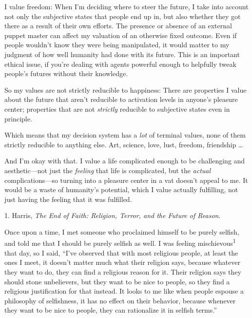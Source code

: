{
 I value freedom: When I'm deciding where to steer
the future, I take into account not only the subjective states that
people end up in, but also whether they got there as a result of their
own efforts. The presence or absence of an external puppet master can
affect my valuation of an otherwise fixed outcome. Even if people
wouldn't know they were being manipulated, it would
matter to my judgment of how well humanity had done with its future.
This is an important ethical issue, if you're dealing
with agents powerful enough to helpfully tweak people's
futures without their knowledge.}

{
 So my values are not strictly reducible to happiness: There are
properties I value about the future that aren't
reducible to activation levels in anyone's pleasure
center; properties that are not \textit{strictly} reducible to
subjective states even in principle.}

{
 Which means that my decision system has a \textit{lot} of terminal
values, none of them strictly reducible to anything else. Art, science,
love, lust, freedom, friendship \ldots}

{
 And I'm okay with that. I value a life complicated
enough to be challenging and aesthetic---not just the \textit{feeling}
that life is complicated, but the \textit{actual} complications---so
turning into a pleasure center in a vat doesn't appeal
to me. It would be a waste of humanity's potential,
which I value actually fulfilling, not just having the feeling that it
was fulfilled.}

\myendsectiontext


\bigskip

{
 1. Harris, \textit{The End of Faith: Religion, Terror, and the
Future of Reason}.}


{
 Once upon a time, I met someone who proclaimed himself to be
purely selfish, and told me that I should be purely selfish as well. I
was feeling mischievous\textsuperscript{1} that day, so I said,
``I've observed that with most
religious people, at least the ones I meet, it doesn't
matter much what their religion says, because whatever they want to do,
they can find a religious reason for it. Their religion says they
should stone unbelievers, but they want to be nice to people, so they
find a religious justification for that instead. It looks to me like
when people espouse a philosophy of selfishness, it has no effect on
their behavior, because whenever they want to be nice to people, they
can rationalize it in selfish terms.'' }

